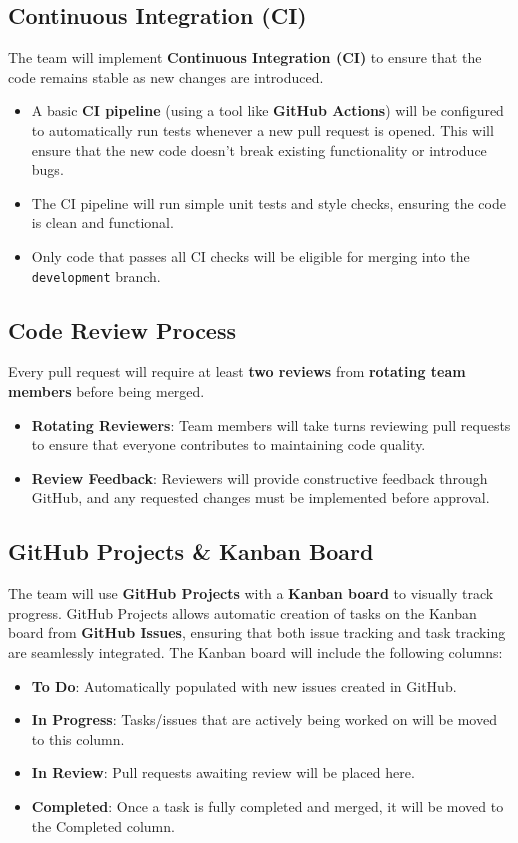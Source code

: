 \documentclass{article}
\begin{document}
\subsection{Continuous Integration (CI)}
The team will implement \textbf{Continuous Integration (CI)} to ensure that the code remains stable as new changes are introduced.
\begin{itemize}
    \item A basic \textbf{CI pipeline} (using a tool like \textbf{GitHub Actions}) will be configured to automatically run tests whenever a new pull request is opened. This will ensure that the new code doesn’t break existing functionality or introduce bugs.
    \item The CI pipeline will run simple unit tests and style checks, ensuring the code is clean and functional.
    \item Only code that passes all CI checks will be eligible for merging into the \texttt{development} branch.
\end{itemize}

\subsection{Code Review Process}
Every pull request will require at least \textbf{two reviews} from \textbf{rotating team members} before being merged.
\begin{itemize}
    \item \textbf{Rotating Reviewers}: Team members will take turns reviewing pull requests to ensure that everyone contributes to maintaining code quality.
    \item \textbf{Review Feedback}: Reviewers will provide constructive feedback through GitHub, and any requested changes must be implemented before approval.
\end{itemize}

\subsection{GitHub Projects \& Kanban Board}
The team will use \textbf{GitHub Projects} with a \textbf{Kanban board} to visually track progress. GitHub Projects allows automatic creation of tasks on the Kanban board from \textbf{GitHub Issues}, ensuring that both issue tracking and task tracking are seamlessly integrated. The Kanban board will include the following columns:
\begin{itemize}
    \item \textbf{To Do}: Automatically populated with new issues created in GitHub.
    \item \textbf{In Progress}: Tasks/issues that are actively being worked on will be moved to this column.
    \item \textbf{In Review}: Pull requests awaiting review will be placed here.
    \item \textbf{Completed}: Once a task is fully completed and merged, it will be moved to the Completed column.
\end{itemize}
\end{document}

